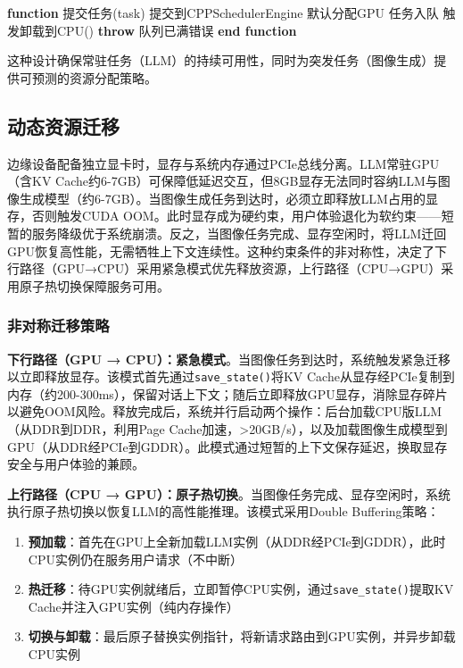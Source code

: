 \begin{algorithm}[t]
\caption{带背压控制的任务调度}
\label{alg:scheduling}
\begin{algorithmic}[1]
\STATE \textbf{function} \textsc{提交任务}(task)
    \STATE 提交到CPPSchedulerEngine
    \STATE 默认分配GPU
        \STATE 任务入队
            \STATE 触发\textsc{卸载到CPU}()
        \ENDIF
    \ELSE
        \STATE \textbf{throw} 队列已满错误
    \ENDIF
\ENDIF
\STATE \textbf{end function}
\end{algorithmic}
\end{algorithm}

这种设计确保常驻任务（LLM）的持续可用性，同时为突发任务（图像生成）提供可预测的资源分配策略。


\subsection{动态资源迁移}

边缘设备配备独立显卡时，显存与系统内存通过PCIe总线分离。LLM常驻GPU（含KV Cache约6-7GB）可保障低延迟交互，但8GB显存无法同时容纳LLM与图像生成模型（约6-7GB）。当图像生成任务到达时，必须立即释放LLM占用的显存，否则触发CUDA OOM。此时显存成为硬约束，用户体验退化为软约束——短暂的服务降级优于系统崩溃。反之，当图像任务完成、显存空闲时，将LLM迁回GPU恢复高性能，无需牺牲上下文连续性。这种约束条件的非对称性，决定了下行路径（GPU→CPU）采用紧急模式优先释放资源，上行路径（CPU→GPU）采用原子热切换保障服务可用。

\subsubsection{非对称迁移策略}

\textbf{下行路径（GPU → CPU）：紧急模式}。当图像任务到达时，系统触发紧急迁移以立即释放显存。该模式首先通过\texttt{save\_state()}将KV Cache从显存经PCIe复制到内存（约200-300ms），保留对话上下文；随后立即释放GPU显存，消除显存碎片以避免OOM风险。释放完成后，系统并行启动两个操作：后台加载CPU版LLM（从DDR到DDR，利用Page Cache加速，>20GB/s），以及加载图像生成模型到GPU（从DDR经PCIe到GDDR）。此模式通过短暂的上下文保存延迟，换取显存安全与用户体验的兼顾。

\textbf{上行路径（CPU → GPU）：原子热切换}。当图像任务完成、显存空闲时，系统执行原子热切换以恢复LLM的高性能推理。该模式采用Double Buffering策略：
\begin{enumerate}
\item \textbf{预加载}：首先在GPU上全新加载LLM实例（从DDR经PCIe到GDDR），此时CPU实例仍在服务用户请求（不中断）
\item \textbf{热迁移}：待GPU实例就绪后，立即暂停CPU实例，通过\texttt{save\_state()}提取KV Cache并注入GPU实例（纯内存操作）
\item \textbf{切换与卸载}：最后原子替换实例指针，将新请求路由到GPU实例，并异步卸载CPU实例
\end{enumerate}

